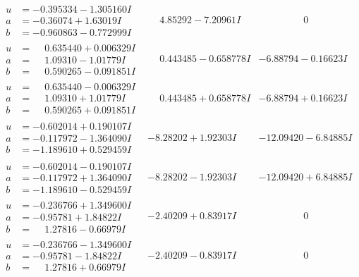 \documentclass[1p]{elsarticle_modified}
\theoremstyle{definition}
\begin{document}
$$\begin{array}{c|c|c}
\begin{aligned}
u &= -0.395334 - 1.305160 I \\
a &= -0.36074 + 1.63019 I \\
b &= -0.960863 - 0.772999 I\end{aligned}
 & \phantom{-}4.85292 - 7.20961 I & \phantom{-0.000000 } 0 \\ \hline\begin{aligned}
u &= \phantom{-}0.635440 + 0.006329 I \\
a &= \phantom{-}1.09310 - 1.01779 I \\
b &= \phantom{-}0.590265 - 0.091851 I\end{aligned}
 & \phantom{-}0.443485 - 0.658778 I & -6.88794 - 0.16623 I \\ \hline\begin{aligned}
u &= \phantom{-}0.635440 - 0.006329 I \\
a &= \phantom{-}1.09310 + 1.01779 I \\
b &= \phantom{-}0.590265 + 0.091851 I\end{aligned}
 & \phantom{-}0.443485 + 0.658778 I & -6.88794 + 0.16623 I \\ \hline\begin{aligned}
u &= -0.602014 + 0.190107 I \\
a &= -0.117972 - 1.364090 I \\
b &= -1.189610 + 0.529459 I\end{aligned}
 & -8.28202 + 1.92303 I & -12.09420 - 6.84885 I \\ \hline\begin{aligned}
u &= -0.602014 - 0.190107 I \\
a &= -0.117972 + 1.364090 I \\
b &= -1.189610 - 0.529459 I\end{aligned}
 & -8.28202 - 1.92303 I & -12.09420 + 6.84885 I \\ \hline\begin{aligned}
u &= -0.236766 + 1.349600 I \\
a &= -0.95781 + 1.84822 I \\
b &= \phantom{-}1.27816 - 0.66979 I\end{aligned}
 & -2.40209 + 0.83917 I & \phantom{-0.000000 } 0 \\ \hline\begin{aligned}
u &= -0.236766 - 1.349600 I \\
a &= -0.95781 - 1.84822 I \\
b &= \phantom{-}1.27816 + 0.66979 I\end{aligned}
 & -2.40209 - 0.83917 I & \phantom{-0.000000 } 0\\

\end{array}$$
\end{document}
